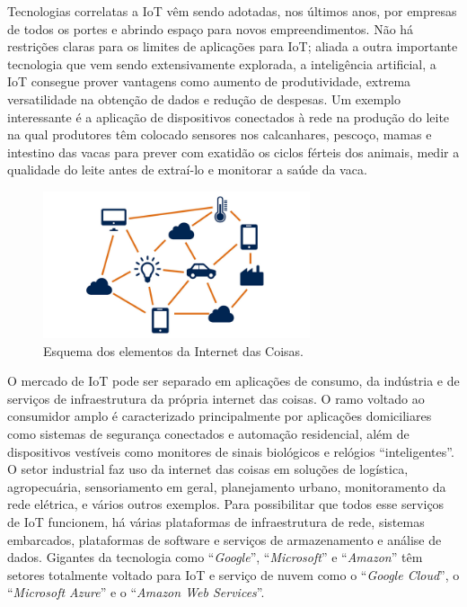 Tecnologias correlatas a \ac{IoT} vêm sendo adotadas, nos últimos anos, por empresas de todos os portes e abrindo espaço para novos empreendimentos. Não há restrições claras para os limites de aplicações para \ac{IoT}; aliada a outra importante tecnologia que vem sendo extensivamente explorada, a inteligência artificial, a \ac{IoT} consegue prover vantagens como aumento de produtividade, extrema versatilidade na obtenção de dados e redução de despesas. Um exemplo interessante é a aplicação de dispositivos conectados à rede na produção do leite \cite{milk} na qual produtores têm colocado sensores nos calcanhares, pescoço, mamas e intestino das vacas para prever com exatidão os ciclos férteis dos animais, medir a qualidade do leite antes de extraí-lo e monitorar a saúde da vaca.

\begin{figure}[ht]
    \begin{center}
    \includegraphics[width=0.7\textwidth]{figuras/iot}
    \end{center}
    \caption[Esquema dos elementos da Internet das Coisas.]{Esquema dos elementos da Internet das Coisas.}
    \label{iot}
\end{figure}

O mercado de \ac{IoT} pode ser separado em aplicações de consumo, da indústria e de serviços de infraestrutura da própria internet das coisas. O ramo voltado ao consumidor amplo é caracterizado principalmente por aplicações domiciliares como sistemas de segurança conectados e automação residencial, além de dispositivos vestíveis como monitores de sinais biológicos e relógios “inteligentes”. O setor industrial faz uso da internet das coisas em soluções de logística, agropecuária, sensoriamento em geral, planejamento urbano, monitoramento da rede elétrica, e vários outros exemplos. Para possibilitar que todos esse serviços de \ac{IoT} funcionem, há várias plataformas de infraestrutura de rede, sistemas embarcados, plataformas de software e serviços de armazenamento e análise de dados. Gigantes da tecnologia como “\textit{Google}”, “\textit{Microsoft}” e “\textit{Amazon}” têm setores totalmente voltado para \ac{IoT} e serviço de nuvem como o “\textit{Google Cloud}”, o “\textit{Microsoft Azure}” e o “\textit{Amazon Web Services}”.


